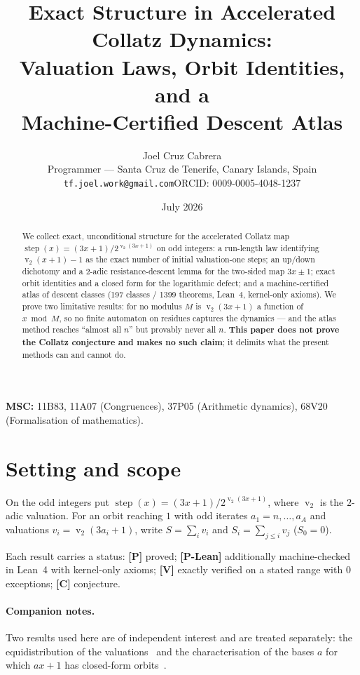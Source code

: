 \documentclass[11pt,a4paper]{article}
\title{\bfseries Exact Structure in Accelerated Collatz Dynamics:\\
Valuation Laws, Orbit Identities, and a\\ Machine-Certified Descent Atlas}
\author{Joel Cruz Cabrera\\
\small Programmer --- Santa Cruz de Tenerife, Canary Islands, Spain\\
\small\texttt{tf.joel.work@gmail.com}\quad ORCID: 0009-0005-4048-1237}
\date{July 2026}
\theoremstyle{plain}
\theoremstyle{definition}
\newcommand{\val}{\operatorname{v}_2}
\newcommand{\step}{\operatorname{step}}
\begin{document}
\maketitle

\begin{abstract}
We collect exact, unconditional structure for the accelerated Collatz map
$\step(x)=(3x+1)/2^{\val(3x+1)}$ on odd integers: a run-length law identifying
$\val(x+1)-1$ as the exact number of initial valuation-one steps; an up/down dichotomy and a
$2$-adic resistance-descent lemma for the two-sided map $3x\pm1$; exact orbit identities and
a closed form for the logarithmic defect; and a machine-certified atlas of descent classes
(197 classes / 1399 theorems, Lean~4, kernel-only axioms). We prove two limitative results:
for no modulus $M$ is $\val(3x+1)$ a function of $x\bmod M$, so no finite automaton on
residues captures the dynamics
--- and the atlas method reaches ``almost all $n$'' but provably never all $n$.
\textbf{This paper does not prove the Collatz conjecture and makes no such claim}; it
delimits what the present methods can and cannot do.
\end{abstract}

\noindent\textbf{MSC:} 11B83, 11A07 (Congruences), 37P05 (Arithmetic dynamics), 68V20
(Formalisation of mathematics).

\section{Setting and scope}
On the odd integers put $\step(x)=(3x+1)/2^{\val(3x+1)}$, where $\val$ is the $2$-adic
valuation. For an orbit reaching $1$ with odd iterates $a_1=n,\dots,a_A$ and valuations
$v_i=\val(3a_i+1)$, write $S=\sum_i v_i$ and $S_i=\sum_{j\le i}v_j$ ($S_0=0$).

Each result carries a status: \textbf{[P]} proved; \textbf{[P-Lean]} additionally
machine-checked in Lean~4 with kernel-only axioms; \textbf{[V]} exactly verified on a stated
range with $0$ exceptions; \textbf{[C]} conjecture.

\paragraph{Companion notes.} Two results used here are of independent interest and are
treated separately: the equidistribution of the valuations~\cite{geom} and the
characterisation of the bases $a$ for which $ax+1$ has closed-form orbits~\cite{fermat}.
\end{document}
